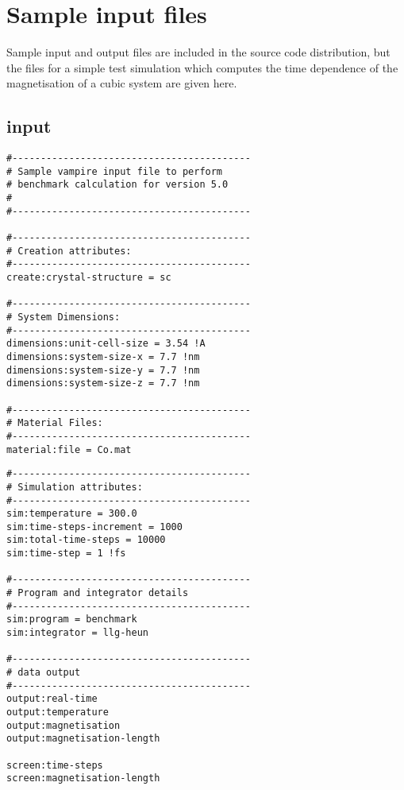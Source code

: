 \section*{Sample input files}
Sample input and output files are included in the source code distribution, but
the files for a simple test simulation which computes the time dependence of the
magnetisation of a cubic system are given here.

\subsection*{input}
{\footnotesize
\begin{verbatim}
#------------------------------------------
# Sample vampire input file to perform
# benchmark calculation for version 5.0
#
#------------------------------------------

#------------------------------------------
# Creation attributes:
#------------------------------------------
create:crystal-structure = sc

#------------------------------------------
# System Dimensions:
#------------------------------------------
dimensions:unit-cell-size = 3.54 !A
dimensions:system-size-x = 7.7 !nm
dimensions:system-size-y = 7.7 !nm
dimensions:system-size-z = 7.7 !nm

#------------------------------------------
# Material Files:
#------------------------------------------
material:file = Co.mat
\end{verbatim}
}

{\footnotesize
\begin{verbatim}
#------------------------------------------
# Simulation attributes:
#------------------------------------------
sim:temperature = 300.0
sim:time-steps-increment = 1000
sim:total-time-steps = 10000
sim:time-step = 1 !fs

#------------------------------------------
# Program and integrator details
#------------------------------------------
sim:program = benchmark
sim:integrator = llg-heun

#------------------------------------------
# data output
#------------------------------------------
output:real-time
output:temperature
output:magnetisation
output:magnetisation-length

screen:time-steps
screen:magnetisation-length
\end{verbatim}
}

